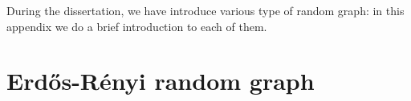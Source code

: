 During the dissertation, we have introduce various type of random graph: in this appendix we do a brief introduction to each of them.

\section{Erd\H{o}s-Rényi random graph}

